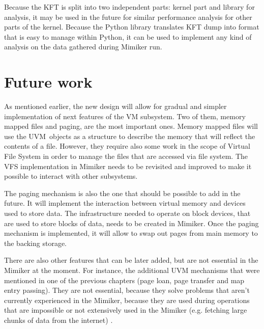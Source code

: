 Because the KFT is split into two independent parts: kernel part and library for analysis,
it may be used in the future for similar performance analysis for other parts of the kernel.
Because the Python library translates KFT dump into format that is easy to manage within Python,
it can be used to implement any kind of analysis on the data gathered during Mimiker run.

\section{Future work}

As mentioned earlier, the new design will allow for gradual and simpler implementation of next features of the VM subsystem.
Two of them, memory mapped files and paging, are the most important ones.
Memory mapped files will use the UVM~objects as a structure to describe the memory that will reflect the contents of a file.
However, they require also some work in the scope of Virtual File System in order to manage the files that are accessed via file system.
The VFS implementation in Mimiker needs to be revisited and improved to make it possible to interact with other subsystems.

The paging mechanism is also the one that should be possible to add in the future.
It will implement the interaction between virtual memory and devices used to store data.
The infrastructure needed to operate on block devices, that are used to store blocks of data, needs to be created in Mimiker.
Once the paging mechanism is implemented, it will allow to swap out pages from main memory to the backing storage.

There are also other features that can be later added, but are not essential in the Mimiker at the moment.
For instance, the additional UVM mechanisms that were mentioned in one of the previous chapters (page loan, page transfer and map entry passing).
They are not essential, because they solve problems that aren't currently experienced in the Mimiker, because they are used during operations that
are impossible or not extensively used in the Mimiker (e.g. fetching large chunks of data from the internet) .
